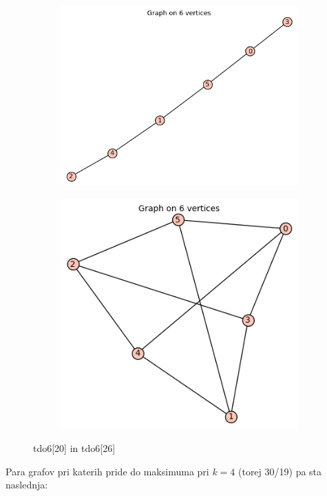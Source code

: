 \documentclass[12pt, a4paper]{article}
\begin{document}
\begin{center}
\begin{figure}[!htb]
\centering
\begin{subfigure}{0.5\textwidth}
  \centering
  \includegraphics[width=0.5\linewidth]{tdo6[20]}
\end{subfigure}%
\begin{subfigure}{0.5\textwidth}
  \centering
  \includegraphics[width=0.5\linewidth]{tdo6[26]}
\end{subfigure}
\caption{tdo6[20] in tdo6[26]}
\label{fig:test}
\end{figure}
\pagebreak
\end{center}
Para grafov pri katerih pride do maksimuma pri $k=4$ (torej 30/19) pa sta naslednja:
\end{document}
